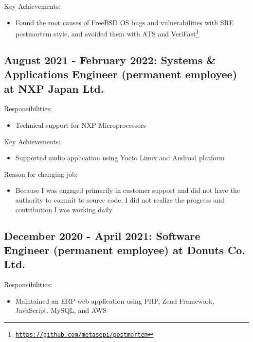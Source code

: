 \documentclass[letterpaper]{article}
\begin{document}
\noindent Key Achievements:

\begin{itemize}
  \item Found the root causes of FreeBSD OS bugs and vulnerabilities with SRE postmortem style, and avoided them with ATS and VeriFast\footnote{\href{https://github.com/metasepi/postmortem}{\tt https://github.com/metasepi/postmortem}}
\end{itemize}

\subsection*{August 2021 - February 2022: Systems \& Applications Engineer  (permanent employee) at NXP Japan Ltd.}

\noindent Responsibilities:

\begin{itemize}
  \item Technical support for NXP Microprocessors
\end{itemize}

\noindent Key Achievements:

\begin{itemize}
  \item Supported audio application using Yocto Linux and Android platform
\end{itemize}

\noindent Reason for changing job:

\begin{itemize}
  \item Because I was engaged primarily in customer support and did not have the authority to commit to source code, I did not realize the progress and contribution I was working daily
\end{itemize}

\subsection*{December 2020 - April 2021: Software Engineer (permanent employee) at Donuts Co. Ltd.}

\noindent Responsibilities:

\begin{itemize}
  \item Maintained an ERP web application using PHP, Zend Framework, JavaScript, MySQL, and AWS
\end{itemize}
\end{document}
